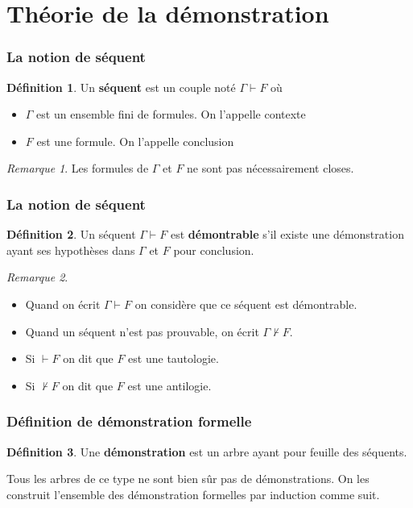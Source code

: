 \documentclass[11pt,a4paper]{beamer}
\theoremstyle{plain}
\theoremstyle{definition}
\newtheorem{defn}{Définition}[section]
\theoremstyle{remark}
\newtheorem*{rem}{Remarque}
\begin{document}
\section{Théorie de la démonstration}
\begin{frame}
\frametitle{La notion de séquent}
\begin{defn}
Un \textbf{séquent} est un couple noté $\Gamma \vdash F$ où
\begin{itemize}
	\item $\Gamma$ est un ensemble fini de formules. On l'appelle contexte
	\item $F$ est une formule. On l'appelle conclusion
\end{itemize}
\end{defn}

\begin{rem}
Les formules de $\Gamma$ et $F$ ne sont pas nécessairement closes.
\end{rem}
\end{frame}

\begin{frame}
\frametitle{La notion de séquent}
\begin{defn}
Un séquent $\Gamma \vdash F$ est \textbf{démontrable} s'il existe une démonstration ayant ses hypothèses dans $\Gamma$ et $F$ pour conclusion.
\end{defn}

\begin{rem}
\begin{itemize}
	\item Quand on écrit $\Gamma \vdash F$ on considère que ce séquent est démontrable.
	\item Quand un séquent n'est pas prouvable, on écrit $\Gamma \nvdash F$.
	\item Si $\vdash F$ on dit que $F$ est une tautologie.
	\item Si $\nvdash F$ on dit que $F$ est une antilogie.
\end{itemize}
\end{rem}
\end{frame}

\begin{frame}
\frametitle{Définition de démonstration formelle}
\begin{defn}
Une \textbf{démonstration} est un arbre ayant pour feuille des séquents.

Tous les arbres de ce type ne sont bien sûr pas de démonstrations. On les construit l'ensemble des démonstration formelles par induction comme suit.
\end{defn}
\end{frame}
\end{document}
